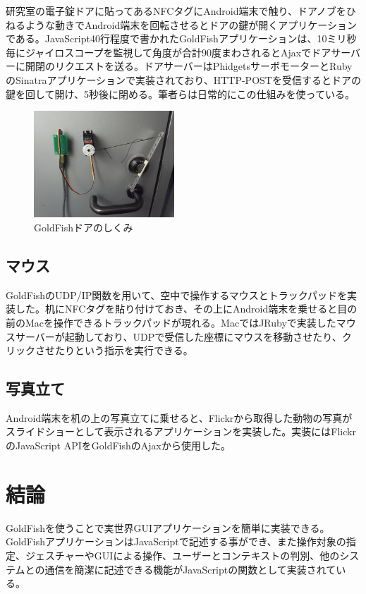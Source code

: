 研究室の電子錠ドアに貼ってあるNFCタグにAndroid端末で触り、ドアノブをひねるような動きでAndroid端末を回転させるとドアの鍵が開くアプリケーションである。JavaScript40行程度で書かれたGoldFishアプリケーションは、10ミリ秒毎にジャイロスコープを監視して角度が合計90度まわされるとAjaxでドアサーバーに開閉のリクエストを送る。ドアサーバーはPhidgetsサーボモーターとRubyのSinatraアプリケーションで実装されており、HTTP-POSTを受信するとドアの鍵を回して開け、5秒後に閉める。筆者らは日常的にこの仕組みを使っている。

\begin{figure}
  \begin{center}
    \includegraphics[height=40mm]{img/door.png}
  \end{center}
  \caption{GoldFishドアのしくみ}
  \label{fig:door}
\end{figure}


\subsection{マウス}
GoldFishのUDP/IP関数を用いて、空中で操作するマウスとトラックパッドを実装した。机にNFCタグを貼り付けておき、その上にAndroid端末を乗せると目の前のMacを操作できるトラックパッドが現れる。MacではJRubyで実装したマウスサーバーが起動しており、UDPで受信した座標にマウスを移動させたり、クリックさせたりという指示を実行できる。


\subsection{写真立て}
Android端末を机の上の写真立てに乗せると、Flickrから取得した動物の写真がスライドショーとして表示されるアプリケーションを実装した。実装にはFlickrのJavaScript APIをGoldFishのAjaxから使用した。


\section{結論}
GoldFishを使うことで実世界GUIアプリケーションを簡単に実装できる。GoldFishアプリケーションはJavaScriptで記述する事ができ、また操作対象の指定、ジェスチャーやGUIによる操作、ユーザーとコンテキストの判別、他のシステムとの通信を簡潔に記述できる機能がJavaScriptの関数として実装されている。


